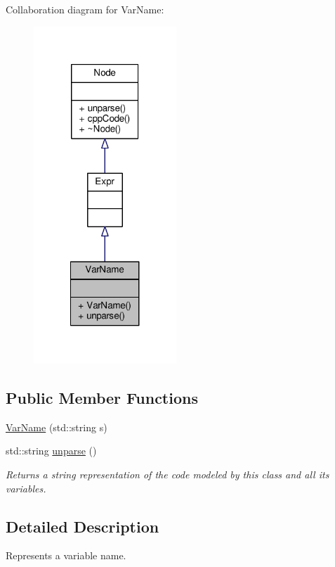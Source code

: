 Collaboration diagram for Var\-Name\-:\nopagebreak
\begin{figure}[H]
\begin{center}
\leavevmode
\includegraphics[width=152pt]{classVarName__coll__graph}
\end{center}
\end{figure}
\subsection*{Public Member Functions}
\begin{DoxyCompactItemize}
\item 
\hyperlink{classVarName_a94e47b4840fe64470bfebf6fd32557f4}{Var\-Name} (std\-::string s)
\item 
std\-::string \hyperlink{classVarName_aabc6d52ebde3abe413bd9a2d75a50f3c}{unparse} ()
\begin{DoxyCompactList}\small\item\em Returns a string representation of the code modeled by this class and all its variables. \end{DoxyCompactList}\end{DoxyCompactItemize}


\subsection{Detailed Description}
Represents a variable name. \par
 

